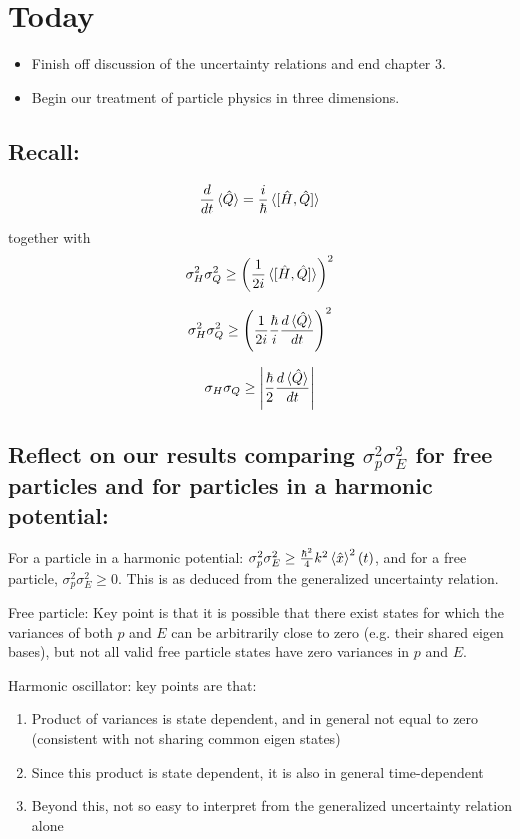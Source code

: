 \documentclass{article}
\begin{document}
\section{Today}

\begin{itemize}
    \item Finish off discussion of the uncertainty relations and end chapter 3. 
    \item Begin our treatment of particle physics in three dimensions. 
\end{itemize}

\hfill

\subsection*{Recall:}

$$\frac{d}{dt} \braket{\hat{Q}} = \frac{i}{\hbar} \braket{[\hat{H}, \hat{Q}]}$$

together with $$\sigma_H^2 \sigma_Q^2 \geq \left( \frac{1}{2i} \braket{[\hat{H}, \hat{Q}]} \right)^2$$

$$\sigma_H^2 \sigma_Q^2 \geq \left( \frac{1}{2i} \frac{\hbar}{i} \frac{d \braket{\hat{Q}}}{dt} \right)^2$$

$$\sigma_H \sigma_Q \geq \left|  \frac{\hbar}{2} \frac{d \braket{\hat{Q}}}{dt} \right|$$

\subsection*{Reflect on our results comparing $\sigma_p^2 \sigma_E^2$  for free particles and for particles in a harmonic potential:}

For a particle in a harmonic potential: $\sigma_p^2 \sigma_E^2 \geq \frac{\hbar^2}{4} k^2 \braket{\hat{x}}^2 (t)$, and for a free particle, $\sigma_p^2 \sigma_E^2 \geq 0$. This is as deduced from the generalized uncertainty relation. 


Free particle: Key point is that it is possible that there exist states for which the variances of both $p$ and $E$ can be arbitrarily close to zero (e.g. their shared eigen bases), but not all valid free particle states have zero variances in $p$ and $E$. 


Harmonic oscillator: key points are that:
\begin{enumerate}
    \item Product of variances is state dependent, and in general not equal to zero (consistent with not sharing common eigen states)
    \item Since this product is state dependent, it is also in general time-dependent
    \item Beyond this, not so easy to interpret from the generalized uncertainty relation alone
\end{enumerate}
\end{document}
